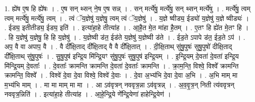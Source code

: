 \documentclass[17pt]{extarticle}
\begin{document}
1. ह्ये॑ष ए॒ष हि ह्ये॑षः । . ए॒ष सन् थ्सन् ने॒ष ए॒ष सन्न् । . सन् मर्त्ये॑षु॒ मर्त्ये॑षु॒ सन् थ्सन् मर्त्ये॑षु । . मर्त्ये॑षु॒ त्वम् त्वम् मर्त्ये॑षु॒ मर्त्ये॑षु॒ त्वम् । . त्वं ॅय॒ज्ञेषु॑ य॒ज्ञेषु॒ त्वम् त्वं ॅय॒ज्ञेषु॑ । . य॒ज्ञे ष्वीड्य॒ ईड्यो॑ य॒ज्ञेषु॑ य॒ज्ञे ष्वीड्यः॑ । . ईड्य॒ इतीतीड्य॒ ईड्य॒ इति॑ । . इत्या॑हा॒हे तीत्या॑ह । . आ॒है॒त मे॒त मा॑हा है॒तम् । . ए॒तꣳ हि ह्ये॑त मे॒तꣳ हि । . हि य॒ज्ञेषु॑ य॒ज्ञेषु॒ हि हि य॒ज्ञेषु॑ । . य॒ज्ञेष्वी ड॑त॒ ईड॑ते य॒ज्ञेषु॑ य॒ज्ञेष्वी ड॑ते । . ईड॒ते ऽपापे ड॑त॒ ईड॒ते ऽप॑ । . अप॒ वै वा अपाप॒ वै । . वै दी᳚क्षि॒ताद् दी᳚क्षि॒ताद् वै वै दी᳚क्षि॒तात् । . दी॒क्षि॒ताथ् सु॑षु॒पुषः॑ सुषु॒पुषो॑ दीक्षि॒ताद् दी᳚क्षि॒ताथ् सु॑षु॒पुषः॑ । . सु॒षु॒पुष॑ इन्द्रि॒य मि॑न्द्रि॒यꣳ सु॑षु॒पुषः॑ सुषु॒पुष॑ इन्द्रि॒यम् । . इ॒न्द्रि॒यम् दे॒वता॑ दे॒वता॑ इन्द्रि॒य मि॑न्द्रि॒यम् दे॒वताः᳚ । . दे॒वताः᳚ क्रामन्ति क्रामन्ति दे॒वता॑ दे॒वताः᳚ क्रामन्ति । . क्रा॒म॒न्ति॒ विश्वे॒ विश्वे᳚ क्रामन्ति क्रामन्ति॒ विश्वे᳚ । . विश्वे॑ दे॒वा दे॒वा विश्वे॒ विश्वे॑ दे॒वाः । . दे॒वा अ॒भ्य॑भि दे॒वा दे॒वा अ॒भि । . अ॒भि माम् मा म॒भ्य॑भि माम् । . मा मा माम् मा मा । . आ ऽव॑वृत्रन् नववृत्र॒न्ना ऽव॑वृत्रन्न् । . अ॒व॒वृ॒त्र॒न् निती त्य॑ववृत्रन् नववृत्र॒न्निति॑ । . इत्या॑हा॒हे तीत्या॑ह । . आ॒हे॒न्द्रि॒ये णे᳚न्द्रि॒येणा॑ हाहेन्द्रि॒येण॑ । \newline
\end{document}
